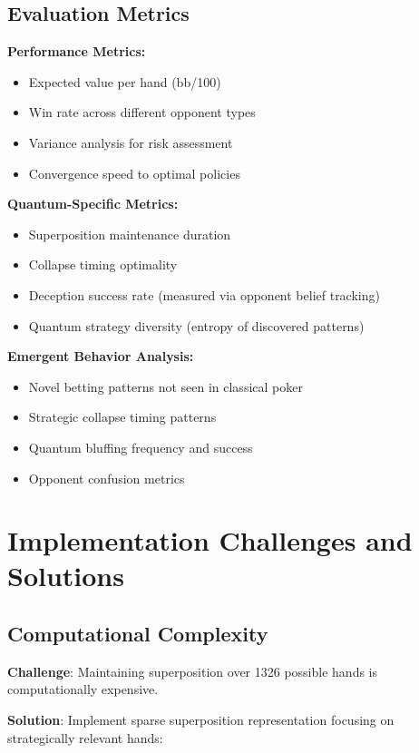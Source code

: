 \documentclass[11pt,a4paper]{article}
\begin{document}
\subsection{Evaluation Metrics}

\textbf{Performance Metrics:}
\begin{itemize}
\item Expected value per hand (bb/100)
\item Win rate across different opponent types
\item Variance analysis for risk assessment
\item Convergence speed to optimal policies
\end{itemize}

\textbf{Quantum-Specific Metrics:}
\begin{itemize}
\item Superposition maintenance duration
\item Collapse timing optimality
\item Deception success rate (measured via opponent belief tracking)
\item Quantum strategy diversity (entropy of discovered patterns)
\end{itemize}

\textbf{Emergent Behavior Analysis:}
\begin{itemize}
\item Novel betting patterns not seen in classical poker
\item Strategic collapse timing patterns
\item Quantum bluffing frequency and success
\item Opponent confusion metrics
\end{itemize}

\section{Implementation Challenges and Solutions}

\subsection{Computational Complexity}

\textbf{Challenge}: Maintaining superposition over 1326 possible hands is computationally expensive.

\textbf{Solution}: Implement sparse superposition representation focusing on strategically relevant hands:
\end{document}
